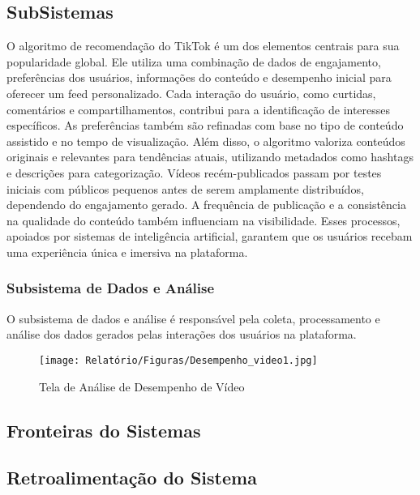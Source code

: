 \subsection{SubSistemas}

O algoritmo de recomendação do TikTok é um dos elementos centrais para sua popularidade global. Ele utiliza uma combinação de dados de engajamento, preferências dos usuários, informações do conteúdo e desempenho inicial para oferecer um feed personalizado. Cada interação do usuário, como curtidas, comentários e compartilhamentos, contribui para a identificação de interesses específicos. As preferências também são refinadas com base no tipo de conteúdo assistido e no tempo de visualização. Além disso, o algoritmo valoriza conteúdos originais e relevantes para tendências atuais, utilizando metadados como hashtags e descrições para categorização. Vídeos recém-publicados passam por testes iniciais com públicos pequenos antes de serem amplamente distribuídos, dependendo do engajamento gerado. A frequência de publicação e a consistência na qualidade do conteúdo também influenciam na visibilidade. Esses processos, apoiados por sistemas de inteligência artificial, garantem que os usuários recebam uma experiência única e imersiva na plataforma.



\subsubsection{Subsistema de Dados e Análise}

O subsistema de dados e análise é responsável pela coleta, processamento e análise dos dados gerados pelas interações dos usuários na plataforma.


\begin{figure}[H]
    \centering
    \texttt{[image: Relatório/Figuras/Desempenho\_video1.jpg]}
    \caption{Tela de Análise de Desempenho de Vídeo}
    \label{fig:enter-label} 
\end{figure}


\subsection{Fronteiras do Sistemas}





\subsection{Retroalimentação do Sistema}

